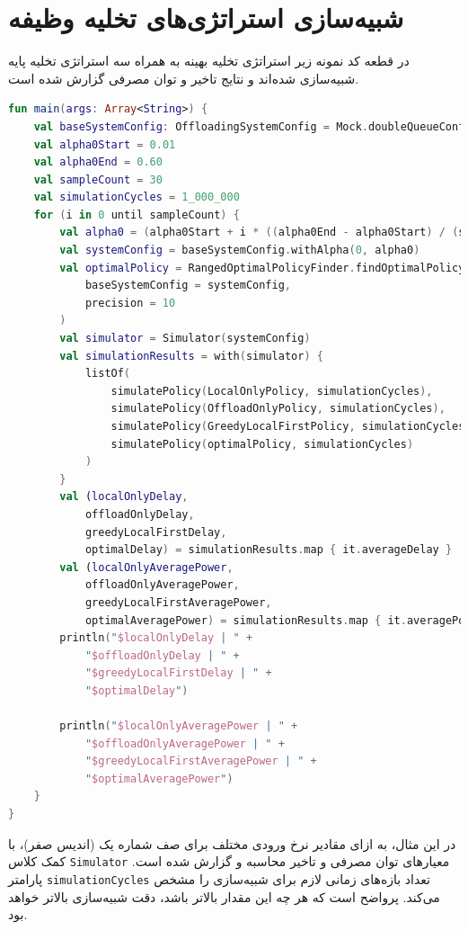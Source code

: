 \section{شبیه‌سازی استراتژی‌های تخلیه وظیفه}
در قطعه کد نمونه زیر استراتژی تخلیه بهینه به همراه سه استراتژی تخلیه پایه شبیه‌سازی شده‌اند و نتایج تاخیر و توان مصرفی گزارش شده است.
\begin{LTR}
	\begin{lstlisting}[language=Kotlin, caption={شبیه‌سازی استراتژی‌های تخلیه وظیفه}, captiondirection=RTL, label={lst:sim}, showstringspaces=false]
fun main(args: Array<String>) {
	val baseSystemConfig: OffloadingSystemConfig = Mock.doubleQueueConfig()
	val alpha0Start = 0.01
	val alpha0End = 0.60
	val sampleCount = 30
	val simulationCycles = 1_000_000
	for (i in 0 until sampleCount) {
		val alpha0 = (alpha0Start + i * ((alpha0End - alpha0Start) / (sampleCount - 1)))
		val systemConfig = baseSystemConfig.withAlpha(0, alpha0)
		val optimalPolicy = RangedOptimalPolicyFinder.findOptimalPolicy(
			baseSystemConfig = systemConfig,
			precision = 10
		)
		val simulator = Simulator(systemConfig)
		val simulationResults = with(simulator) {
			listOf(
				simulatePolicy(LocalOnlyPolicy, simulationCycles),
				simulatePolicy(OffloadOnlyPolicy, simulationCycles),
				simulatePolicy(GreedyLocalFirstPolicy, simulationCycles),
				simulatePolicy(optimalPolicy, simulationCycles)
			)
		}
		val (localOnlyDelay,
			offloadOnlyDelay,
			greedyLocalFirstDelay,
			optimalDelay) = simulationResults.map { it.averageDelay }
		val (localOnlyAveragePower,
			offloadOnlyAveragePower,
			greedyLocalFirstAveragePower,
			optimalAveragePower) = simulationResults.map { it.averagePowerConsumption }
		println("$localOnlyDelay | " +
			"$offloadOnlyDelay | " +
			"$greedyLocalFirstDelay | " +
			"$optimalDelay")
		
		println("$localOnlyAveragePower | " +
			"$offloadOnlyAveragePower | " +
			"$greedyLocalFirstAveragePower | " +
			"$optimalAveragePower")
	}
}
	\end{lstlisting}
\end{LTR}
در این مثال، به ازای مقادیر نرخ ورودی مختلف برای صف شماره یک (اندیس صفر)، با کمک کلاس \texttt{\footnotesize Simulator} معیارهای توان مصرفی و تاخیر محاسبه و گزارش شده است. پارامتر \texttt{\footnotesize simulationCycles} تعداد بازه‌های زمانی لازم برای شبیه‌سازی را مشخص می‌کند. پرواضح است که هر چه این مقدار بالاتر باشد، دقت شبیه‌سازی بالاتر خواهد بود. 
\newpage
